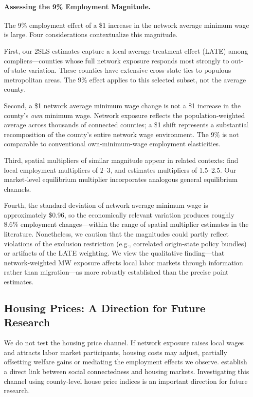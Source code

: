 \documentclass[12pt]{article}
\begin{document}
\paragraph{Assessing the 9\% Employment Magnitude.} The 9\% employment effect of a \$1 increase in the network average minimum wage is large. Four considerations contextualize this magnitude.

First, our 2SLS estimates capture a local average treatment effect (LATE) among compliers---counties whose full network exposure responds most strongly to out-of-state variation. These counties have extensive cross-state ties to populous metropolitan areas. The 9\% effect applies to this selected subset, not the average county.

Second, a \$1 network average minimum wage change is not a \$1 increase in the county's \textit{own} minimum wage. Network exposure reflects the population-weighted average across thousands of connected counties; a \$1 shift represents a substantial recomposition of the county's entire network wage environment. The 9\% is not comparable to conventional own-minimum-wage employment elasticities.

Third, spatial multipliers of similar magnitude appear in related contexts: \citet{klinemoretti2014} find local employment multipliers of 2--3, and \citet{moretti2011local} estimates multipliers of 1.5--2.5. Our market-level equilibrium multiplier incorporates analogous general equilibrium channels.

Fourth, the standard deviation of network average minimum wage is approximately \$0.96, so the economically relevant variation produces roughly 8.6\% employment changes---within the range of spatial multiplier estimates in the literature. Nonetheless, we caution that the magnitudes could partly reflect violations of the exclusion restriction (e.g., correlated origin-state policy bundles) or artifacts of the LATE weighting. We view the qualitative finding---that network-weighted MW exposure affects local labor markets through information rather than migration---as more robustly established than the precise point estimates.

\subsection{Housing Prices: A Direction for Future Research}

We do not test the housing price channel. If network exposure raises local wages and attracts labor market participants, housing costs may adjust, partially offsetting welfare gains \citep{roback1982wages} or mediating the employment effects we observe. \citet{bailey2018house} establish a direct link between social connectedness and housing markets. Investigating this channel using county-level house price indices is an important direction for future research.
\end{document}
